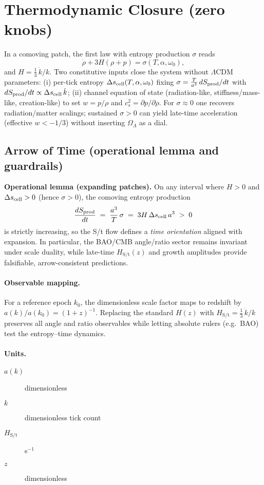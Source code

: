 \section*{Thermodynamic Closure (zero knobs)}
In a comoving patch, the first law with entropy production $\sigma$ reads
\begin{equation*}
\dot\rho + 3H(\rho+p) = \sigma(T,\alpha,\omega_0),
\end{equation*}
and $H=\tfrac13\,\dot k/k$. Two constitutive inputs close the system without $\Lambda$CDM parameters:
(i) per-tick entropy $\Delta s_{\rm cell}(T,\alpha,\omega_0)$ fixing $\sigma=\tfrac{T}{a^3}\,dS_{\rm prod}/dt$ with $dS_{\rm prod}/dt\propto \Delta s_{\rm cell}\,\dot k$;
(ii) channel equation of state (radiation-like, stiffness/mass-like, creation-like) to set $w=p/\rho$ and $c_s^2=\partial p/\partial\rho$.
For $\sigma\!\approx\!0$ one recovers radiation/matter scalings; sustained $\sigma>0$ can yield late-time acceleration (effective $w<-1/3$)
without inserting $\Omega_{\Lambda}$ as a dial.

\subsection*{Arrow of Time (operational lemma and guardrails)}
\noindent\textbf{Operational lemma (expanding patches).}
On any interval where $H>0$ and $\Delta s_{\rm cell}>0$ (hence $\sigma>0$), the comoving entropy production
\[
\frac{dS_{\rm prod}}{dt} \;=\; \frac{a^3}{T}\,\sigma \;=\; 3H\,\Delta s_{\rm cell}\,a^3 \;>\; 0
\]
is strictly increasing, so the S/t flow defines a \emph{time orientation} aligned with expansion. In particular, the BAO/CMB angle/ratio sector remains invariant under scale duality, while late-time $H_{\text{S/t}}(z)$ and growth amplitudes provide falsifiable, arrow-consistent predictions.

\paragraph{Observable mapping.}
For a reference epoch $k_0$, the dimensionless scale factor maps to redshift by $a(k)/a(k_0)=(1+z)^{-1}$. Replacing the standard $H(z)$ with $H_{\text{S/t}}=\tfrac{1}{3}\,\dot k/k$ preserves all angle and ratio observables while letting absolute rulers (e.g.\ BAO) test the entropy--time dynamics.

\paragraph{Units.}
\begin{description}
\item[$a(k)$] dimensionless
\item[$k$] dimensionless tick count
\item[$H_{\text{S/t}}$] s$^{-1}$
\item[$z$] dimensionless
\end{description}


